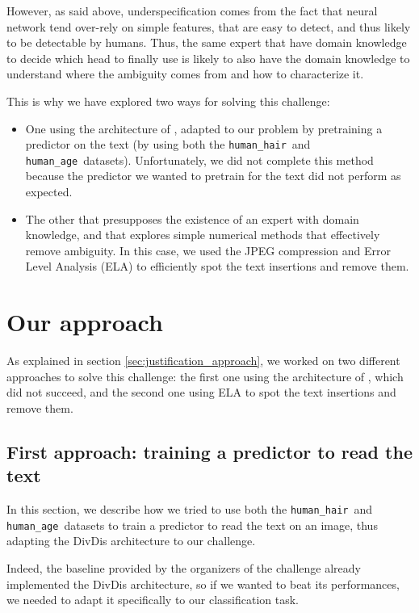 \documentclass[sigconf, nonacm]{acmart}
\newcommand{\humanAge}{\texttt{human\_age}\ }
\newcommand{\humanHair}{\texttt{human\_hair}\ }
\begin{document}
However, as said above, underspecification comes from the fact that neural network tend over-rely on simple features, that are easy to detect, and thus likely to be detectable by humans. Thus, the same expert that have domain knowledge to decide which head to finally use is likely to also have the domain knowledge to understand where the ambiguity comes from and how to characterize it. 

This is why we have explored two ways for solving this challenge:
\begin{itemize}
    \item One using the architecture of \cite{lee_diversify_2022}, adapted to our problem by pretraining a predictor on the text (by using both the \humanHair and \humanAge datasets). Unfortunately, we did not complete this method because the predictor we wanted to pretrain for the text did not perform as expected.
    \item The other that presupposes the existence of an expert with domain knowledge, and that explores simple numerical methods that effectively remove ambiguity. In this case, we used the JPEG compression and Error Level Analysis (ELA) to efficiently spot the text insertions and remove them. 
\end{itemize}

\section{Our approach}
\label{sec:our_approach}

As explained in section \ref{sec:justification_approach}, we worked on two different approaches to solve this challenge: the first one using the architecture of \cite{lee_diversify_2022}, which did not succeed, and the second one using ELA to spot the text insertions and remove them.

\subsection{First approach: training a predictor to read the text}
\label{sec:first_approach}

In this section, we describe how we tried to use both the \humanHair and \humanAge datasets to train a predictor to read the text on an image, thus adapting the DivDis architecture \cite{lee_diversify_2022} to our challenge.

\medskip

Indeed, the baseline provided by the organizers of the challenge already implemented the DivDis architecture, so if we wanted to beat its performances, we needed to adapt it specifically to our classification task.
\end{document}
